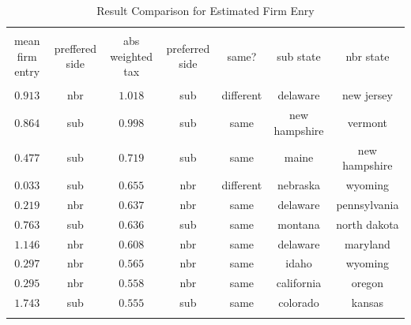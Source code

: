 \documentclass[12pt,a4paper]{article}
\begin{document}
\begin{table}[!htbp] \centering 
  \caption{Result Comparison for Estimated Firm Enry} 
  \label{taxtable} 
\tiny 
\begin{tabular}{@{\extracolsep{5pt}} ccccccc} 
\\[-1.8ex]\hline 
\hline \\[-1.8ex] 
mean firm entry & preffered side & abs weighted tax & preferred side & same? & sub state & nbr state \\ 
\hline \\[-1.8ex] 
$0.913$ & nbr & $1.018$ & sub & different & delaware & new jersey \\ 
$0.864$ & sub & $0.998$ & sub & same & new hampshire & vermont \\ 
$0.477$ & sub & $0.719$ & sub & same & maine & new hampshire \\ 
$0.033$ & sub & $0.655$ & nbr & different & nebraska & wyoming \\ 
$0.219$ & nbr & $0.637$ & nbr & same & delaware & pennsylvania \\ 
$0.763$ & sub & $0.636$ & sub & same & montana & north dakota \\ 
$1.146$ & nbr & $0.608$ & nbr & same & delaware & maryland \\ 
$0.297$ & nbr & $0.565$ & nbr & same & idaho & wyoming \\ 
$0.295$ & nbr & $0.558$ & nbr & same & california & oregon \\ 
$1.743$ & sub & $0.555$ & sub & same & colorado & kansas \\ 
\hline \\[-1.8ex] 
\end{tabular} 
\end{table} 
\end{document}
